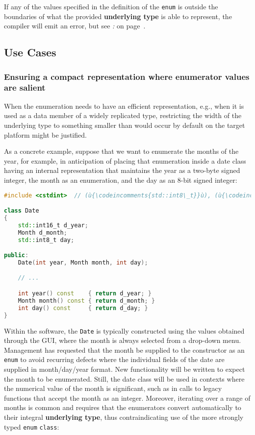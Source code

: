\noindent If any of the values specified in the definition of the \texttt{enum} is
outside the boundaries of what the provided \textbf{underlying type} is
able to represent, the compiler will emit an error, but see \textit{: } on page~\pageref{subtleties-of-integral-promotion}.

\subsection[Use Cases]{Use Cases}\label{use-cases}

\subsubsection[Ensuring a compact representation where enumerator values are salient]{Ensuring a compact representation where enumerator values are salient}\label{ensuring-a-compact-representation-where-enumerator-values-are-salient}

When the enumeration needs to have an efficient representation, e.g.,
when it is used as a data member of a widely replicated type,
restricting the width of the underlying type to something smaller than
would occur by default on the target platform might be justified.

As a concrete example, suppose that we want to enumerate the months of
the year, for example, in anticipation of placing that enumeration
inside a date class having an internal representation that maintains the
year as a two-byte signed integer, the month as an enumeration, and the
day as an 8-bit signed integer:

\begin{lstlisting}[language=C++]
#include <cstdint>  // (ù{\codeincomments{std::int8\_t}}ù), (ù{\codeincomments{std::int16\_t}}ù)

class Date
{
    std::int16_t d_year;
    Month d_month;
    std::int8_t day;

public:
    Date(int year, Month month, int day);

    // ...

    int year() const    { return d_year; }
    Month month() const { return d_month; }
    int day() const     { return d_day; }
}
\end{lstlisting}

\noindent Within the software, the \texttt{Date} is typically constructed using
the values obtained through the GUI, where the month is always selected
from a drop-down menu. Management has requested that the month be
supplied to the constructor as an \texttt{enum} to avoid recurring
defects where the individual fields of the date are supplied in
month/day/year format. New functionality will be written to expect the
month to be enumerated. Still, the date class will be used in contexts
where the numerical value of the month is significant, such as in calls
to legacy functions that accept the month as an integer. Moreover,
iterating over a range of months is common and requires that the
enumerators convert automatically to their integral \textbf{underlying
type}, thus contraindicating use of the more strongly typed
\texttt{enum} \texttt{class}:

